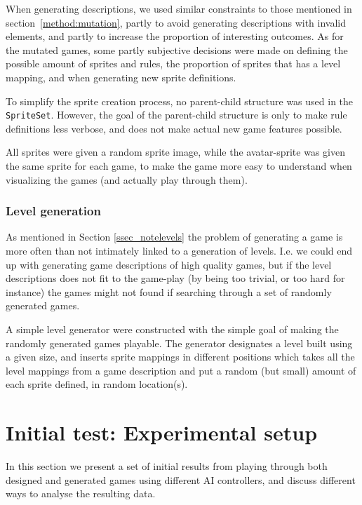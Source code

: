 \documentclass[a4paper,titlepage,final]{report}
\begin{document}
When generating descriptions, we used similar constraints to those mentioned in section~\ref{method:mutation}, partly to avoid generating descriptions with invalid elements, and partly to increase the proportion of interesting outcomes. 
As for the mutated games, some partly subjective decisions were made on defining the possible amount of sprites and rules, the proportion of sprites that has a level mapping, and when generating new sprite definitions.

To simplify the sprite creation process, no parent-child structure was used in the \texttt{SpriteSet}.
However, the goal of the parent-child structure is only to make rule definitions less verbose, and does not make actual new game features possible.

All sprites were given a random sprite image, while the avatar-sprite was given the same sprite for each game, to make the game more easy to understand when visualizing the games (and actually play through them).



\subsubsection*{Level generation}
As mentioned in Section \ref{ssec_notelevels} the problem of generating a game is more often than not intimately linked to a generation of levels.
I.e. we could end up with generating game descriptions of high quality games, but if the level descriptions does not fit to the game-play (by being too trivial, or too hard for instance) the games might not found if searching through a set of randomly generated games.

A simple level generator were constructed with the simple goal of making the randomly generated games playable.
The generator designates a level built using a given size, and inserts sprite mappings in different positions which takes all the level mappings from a game description and put a random (but small) amount of each sprite defined, in random location(s).





\section{Initial test: Experimental setup}
\label{sec_task1inittestsetup}
In this section we present a set of initial results from playing through both designed and generated games using different AI controllers, and discuss different ways to analyse the resulting data.
\end{document}
